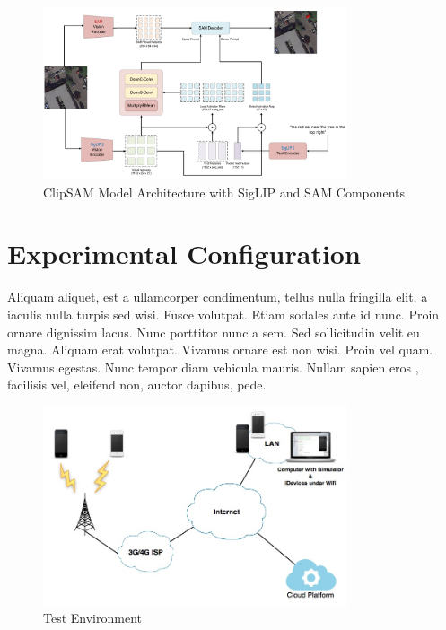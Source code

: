 \begin{figure}[H]
\centering
\includegraphics[width=0.8\textwidth]{./Images/clipsam.png}
\caption{ClipSAM Model Architecture with SigLIP and SAM Components}
\label{fig:clipsam_architecture}
\end{figure}

\section{Experimental Configuration} 
Aliquam aliquet, est a ullamcorper condimentum, tellus nulla fringilla elit, a iaculis nulla turpis sed wisi. Fusce volutpat. Etiam sodales ante id nunc. Proin ornare dignissim lacus. Nunc porttitor nunc a sem. Sed sollicitudin velit eu magna. Aliquam erat volutpat. Vivamus ornare est non wisi. Proin vel quam. Vivamus egestas. Nunc tempor diam vehicula mauris. Nullam sapien eros , facilisis vel, eleifend non, auctor dapibus, pede.

\begin{figure}[h]
\centering
\includegraphics[width=0.8\textwidth]{./Images/test_env}
\caption{Test Environment}
\label{fig:test_env}
\end{figure}

